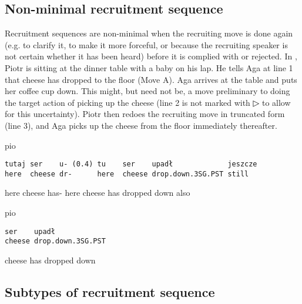 \documentclass[output=paper]{langsci/langscibook}
\begin{document}
\subsection{Non-minimal recruitment sequence}

Recruitment sequences are non-minimal when the recruiting move is done again (e.g. to clarify it, to make it more forceful, or because the recruiting speaker is not certain whether it has been heard) before it is complied with or rejected.  In , Piotr is sitting at the dinner table with a baby on his lap.  He tells Aga at line 1 that cheese has dropped to the floor (Move A).  Aga arrives at the table and puts her coffee cup down.  This might, but need not be, a move preliminary to doing the target action of picking up the cheese (line 2 is not marked with ▷ to allow for this uncertainty).  Piotr then redoes the recruiting move in truncated form (line 3), and Aga picks up the cheese from the floor immediately thereafter.

\vspace{-1mm}
%
\begin{mdframednoverticalspace}[style=firstfoc]
\begin{transbox}{1}{pio}
\begin{verbatim}
tutaj ser    u- (0.4) tu    ser    upadł             jeszcze
here  cheese dr-      here  cheese drop.down.3SG.PST still
\end{verbatim}
here cheese has- \hspace{1cm} here cheese has dropped down also
\end{transbox}
\end{mdframednoverticalspace}
%
%
\begin{mdframednoverticalspace}[style=firstfoc]
\begin{transbox}{3}{pio}
\begin{verbatim}
ser    upadł
cheese drop.down.3SG.PST
\end{verbatim}
cheese has dropped down
\end{transbox}
\end{mdframednoverticalspace}
%
\begin{mdframednoverticalspace}[style=secondfoc]
\end{mdframednoverticalspace}\vspace{-2mm}

\subsection{Subtypes of recruitment sequence}
\end{document}
